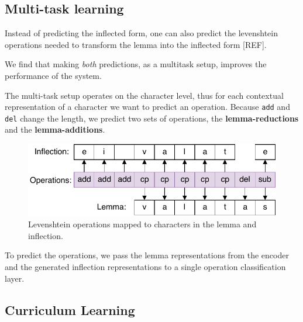 \documentclass[11pt,a4paper]{article}
\begin{document}

\subsection{Multi-task learning}

Instead of predicting the inflected form, one can also predict the
levenshtein operations needed to transform the lemma into the
inflected form [REF].

We find that making \emph{both} predictions, as a multitask setup,
improves the performance of the system.

The multi-task setup operates on the character level, thus for each
contextual representation of a character we want to predict an
operation. Because \texttt{add} and \texttt{del} change the length, we
predict two sets of operations, the \textbf{lemma-reductions} and the
\textbf{lemma-additions}.


\begin{figure}[ht]
\centering
\includegraphics[scale=0.5]{ops.pdf}
\caption{Levenshtein operations mapped to characters in the lemma and inflection.}
\end{figure}

To predict the operations, we pass the lemma representations from the
encoder and the generated inflection representations to a single operation
classification layer.


\subsection{Curriculum Learning}
\end{document}
